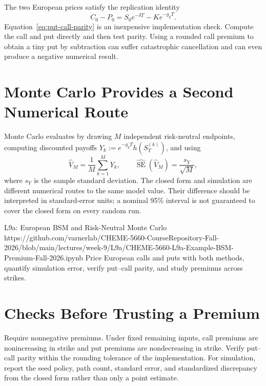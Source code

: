 \documentclass[11pt]{article}
\begin{document}
The two European prices satisfy the replication identity
\begin{equation}
  \label{eq:put-call-parity}
  C_0-P_0=S_0e^{-\delta T}-Ke^{-g_yT}.
\end{equation}
Equation~\eqref{eq:put-call-parity} is an inexpensive implementation check. Compute the call and put directly and then test parity. Using a rounded call premium to obtain a tiny put by subtraction can suffer catastrophic cancellation and can even produce a negative numerical result.

\section{Monte Carlo Provides a Second Numerical Route}

Monte Carlo evaluates  by drawing $M$ independent risk-neutral endpoints, computing discounted payoffs $Y_k:=e^{-g_yT}h(S_T^{(k)})$, and using
\begin{equation}
  \label{eq:mc-estimator}
  \widehat V_M=\frac1M\sum_{k=1}^{M}Y_k,
  \qquad
  \widehat{\operatorname{SE}}(\widehat V_M)=\frac{s_Y}{\sqrt M},
\end{equation}
where $s_Y$ is the sample standard deviation. The closed form and simulation are different numerical routes to the same model value. Their difference should be interpreted in standard-error units; a nominal 95\% interval is not guaranteed to cover the closed form on every random run.

\notebooklink
  {L9a: European BSM and Risk-Neutral Monte Carlo}
  {https://github.com/varnerlab/CHEME-5660-CourseRepository-Fall-2026/blob/main/lectures/week-9/L9a/CHEME-5660-L9a-Example-BSM-Premium-Fall-2026.ipynb}
  {Price European calls and puts with both methods, quantify simulation error, verify put--call parity, and study premiums across strikes.}

\section{Checks Before Trusting a Premium}

Require nonnegative premiums. Under fixed remaining inputs, call premiums are nonincreasing in strike and put premiums are nondecreasing in strike. Verify put--call parity within the rounding tolerance of the implementation. For simulation, report the seed policy, path count, standard error, and standardized discrepancy from the closed form rather than only a point estimate.
\end{document}
